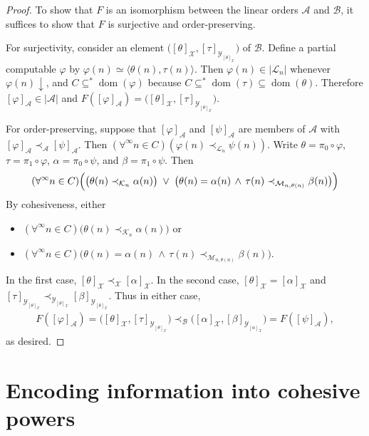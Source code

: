 \documentclass[11pt,a4paper,reqno]{amsart}
\theoremstyle{definition}
\DeclareMathOperator{\dom}{\mathrm{dom}}
\newcommand{\la}{\langle}
\newcommand{\ra}{\rangle}
\newcommand{\da}{{\downarrow}}
\newcommand{\keq}{\simeq}
\newcommand{\forae}{\forall^\infty}
\newcommand{\mc}[1]{\mathcal{#1}}
\begin{document}
\begin{proof}
To show that $F$ is an isomorphism between the linear orders $\mc{A}$ and $\mc{B}$, it suffices to show that $F$ is surjective and order-preserving.

For surjectivity, consider an element $\bigl([\theta]_\mc{X}, [\tau]_{\mc{Y}_{[\theta]_\mc{X}}}\bigr)$ of $\mc{B}$.  Define a partial computable $\varphi$ by $\varphi(n) \keq \la \theta(n), \tau(n) \ra$.  Then $\varphi(n) \in |\mc{L}_n|$ whenever $\varphi(n)\da$, and $C \subseteq^* \dom(\varphi)$ because $C \subseteq^* \dom(\tau) \subseteq \dom(\theta)$.  Therefore $[\varphi]_\mc{A} \in |\mc{A}|$ and $F([\varphi]_\mc{A}) = \bigl([\theta]_\mc{X}, [\tau]_{\mc{Y}_{[\theta]_\mc{X}}}\bigr)$.

For order-preserving, suppose that $[\varphi]_\mc{A}$ and $[\psi]_\mc{A}$ are members of $\mc{A}$ with $[\varphi]_\mc{A} \prec_\mc{A} [\psi]_\mc{A}$.  Then $(\forae n \in C)(\varphi(n) \prec_{\mc{L}_n} \psi(n))$.  Write $\theta = \pi_0 \circ \varphi$, $\tau = \pi_1 \circ \varphi$, $\alpha = \pi_0 \circ \psi$, and $\beta = \pi_1 \circ \psi$.  Then
\begin{align*}
(\forae n \in C)\Bigl( \bigl( \theta(n) \prec_{\mc{K}_n} \alpha(n) \bigr) \;\lor\; \bigl( \theta(n) = \alpha(n) \,\land\, \tau(n) \prec_{\mc{M}_{n, \theta(n)}} \beta(n) \bigr) \Bigr)
\end{align*}
By cohesiveness, either
\begin{itemize}
\item $(\forae n \in C)\bigl( \theta(n) \prec_{\mc{K}_n} \alpha(n) \bigr)$ or

\smallskip

\item $(\forae n \in C)\bigl( \theta(n) = \alpha(n) \,\land\, \tau(n) \prec_{\mc{M}_{n, \theta(n)}} \beta(n) \bigr)$.
\end{itemize}
In the first case, $[\theta]_\mc{X} \prec_\mc{X} [\alpha]_\mc{X}$.  In the second case, $[\theta]_\mc{X} = [\alpha]_\mc{X}$ and $[\tau]_{\mc{Y}_{[\theta]_\mc{X}}} \prec_{\mc{Y}_{[\theta]_\mc{X}}} [\beta]_{\mc{Y}_{[\theta]_\mc{X}}}$.  Thus in either case,
\begin{align*}
F([\varphi]_\mc{A}) = \bigl( [\theta]_\mc{X}, [\tau]_{\mc{Y}_{[\theta]_\mc{X}}} \bigr) \prec_\mc{B} \bigl( [\alpha]_\mc{X}, [\beta]_{\mc{Y}_{[\alpha]_\mc{X}}} \bigr) = F([\psi]_\mc{A}),
\end{align*}
as desired.
\end{proof}


\section{Encoding information into cohesive powers}\label{sec-graph}
\end{document}
